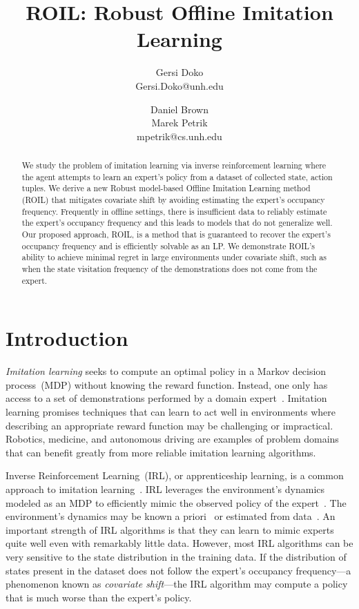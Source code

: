 \documentclass[10pt]{article}
\title{ROIL: Robust Offline Imitation Learning}
\author{Gersi Doko \\
        Gersi.Doko@unh.edu \\
        \and 
        Daniel Brown \\
        Marek Petrik \\
        mpetrik@cs.unh.edu 
      }
\renewcommand{\cite}{\citep}
\theoremstyle{plain}
\theoremstyle{remark}
\begin{document}
\maketitle

\begin{abstract}
We study the problem of imitation learning via inverse reinforcement learning where the agent attempts to learn an expert's policy from a dataset of collected state, action tuples. We derive a new Robust model-based Offline Imitation Learning method (ROIL) that mitigates covariate shift by avoiding estimating the expert's occupancy frequency. Frequently in offline settings, there is insufficient data to reliably estimate the expert's occupancy frequency and this leads to models that do not generalize well. Our proposed approach, ROIL, is a method that is guaranteed to recover the expert's occupancy frequency and is efficiently solvable as an LP. We demonstrate ROIL's ability to achieve minimal regret in large environments under covariate shift, such as when the state visitation frequency of the demonstrations does not come from the expert.
\end{abstract}

\section{Introduction}

\emph{Imitation learning} seeks to compute an optimal policy in a Markov decision process~(MDP) without knowing the reward function. Instead, one only has access to a set of demonstrations performed by a domain expert~\cite{chang2021mitigating, Panaganti2023, Spencer2021, Rashidinejad2022}. Imitation learning promises techniques that can learn to act well in environments where describing an appropriate reward function may be challenging or impractical. Robotics, medicine, and autonomous driving are examples of problem domains that can benefit greatly from more reliable imitation learning algorithms. 

Inverse Reinforcement Learning~(IRL), or apprenticeship learning, is a common approach to imitation learning~\cite{abbeel2004, ziebart2008maximum, Brown2018a, fu2018learning}. IRL leverages the environment's dynamics modeled as an MDP to efficiently mimic the observed policy of the expert~\cite{arora2021survey}. The environment's dynamics may be known a priori~\cite{Syed2008, lacotte2019} or estimated from data~\cite{Ho2016,chang2021mitigating}. An important strength of IRL algorithms is that they can learn to mimic experts quite well even with remarkably little data. However, most IRL algorithms can be very sensitive to the state distribution in the training data. If the distribution of states present in the dataset does not follow the expert's occupancy frequency---a phenomenon known as \emph{covariate shift}---the IRL algorithm may compute a policy that is much worse than the expert's policy. 
\end{document}
